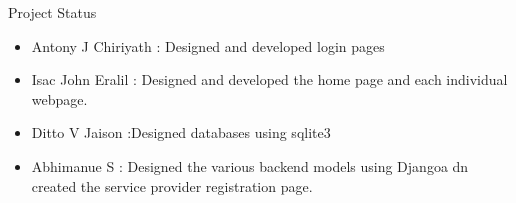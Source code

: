\documentclass{beamer} %
\begin{document}
\begin{frame}{Project Status}
        \begin{itemize}
            \item Antony J Chiriyath : Designed and developed login pages
            \item Isac John Eralil : Designed and developed the home page and each individual webpage.
            \item Ditto V Jaison :Designed databases using sqlite3
            \item Abhimanue S : Designed the various backend models using Djangoa dn created the service provider registration page.
        \end{itemize}
    
    
    \vspace{10pt} %
    \begin{figure}
        \hfill
    \end{figure}
\end{frame}





%       
               
\end{document}
